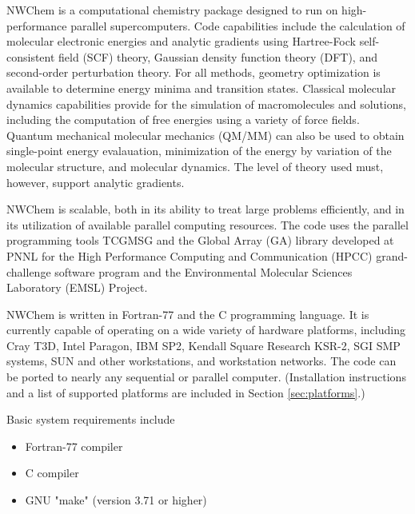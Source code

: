 


NWChem is a computational chemistry package designed to run on high-performance 
parallel supercomputers.  Code capabilities include the calculation of molecular 
electronic energies and analytic gradients using Hartree-Fock self-consistent 
field (SCF) theory, Gaussian density function theory (DFT), and second-order 
perturbation theory.  For all methods, geometry optimization is available to 
determine energy minima and transition states.  Classical molecular dynamics 
capabilities provide for the simulation of macromolecules and solutions, 
including the computation of free energies using a variety of force fields.
Quantum mechanical molecular mechanics (QM/MM) can also be used to obtain single-point
energy evalauation, minimization of the energy by variation of the molecular 
structure, and molecular dynamics.  The level of theory used must, however, support
analytic gradients.

NWChem is scalable, both in its ability to treat large problems efficiently, 
and in its utilization of available parallel computing resources.  The 
code uses the parallel programming tools TCGMSG and the Global Array (GA) 
library developed at PNNL for the High Performance Computing and Communication 
(HPCC) grand-challenge software program and the Environmental Molecular 
Sciences Laboratory (EMSL) Project.

NWChem is written in Fortran-77 and the C programming language.  It is currently 
capable of operating on a wide variety of hardware platforms, including Cray T3D,
Intel Paragon, IBM SP2, Kendall Square Research KSR-2, SGI SMP systems, 
SUN and other workstations, and workstation networks.  The code can be ported
to nearly any sequential or parallel computer.
(Installation instructions and a list of supported platforms are included in
Section \ref{sec:platforms}.)

Basic system requirements include

\begin{itemize}
\item Fortran-77 compiler
\item C compiler 
\item GNU "make" (version 3.71 or higher)
\end{itemize}


